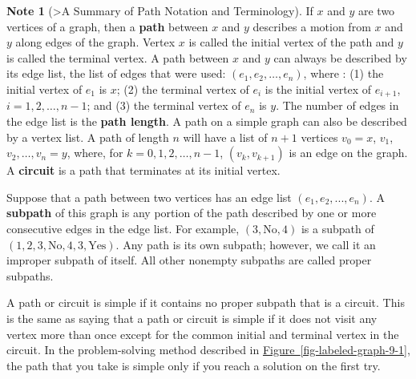 \documentclass[10pt,]{book}
\newcommand{\terminology}[1]{\textbf{#1}}
\theoremstyle{plain}
\theoremstyle{definition}
\theoremstyle{definition}
\newtheorem{note}[theorem]{Note}
\theoremstyle{definition}
\theoremstyle{definition}
\theoremstyle{definition}
\numberwithin{equation}{section}
\begin{document}
\begin{note}[>A Summary of Path Notation and Terminology]\label{note-2}
If \(x\) and \(y\) are two vertices of a graph, then a \terminology{path} between \(x\) and \(y\) describes a motion from \(x\) and
\(y\) along edges of the graph. Vertex \(x\) is called the initial vertex of the path and \(y\) is called the terminal vertex.
A path between \(x\) and \(y\) can always be described by its  edge list, the list of edges that were used: \(\left(e_1, e_2,
\ldots , e_n\right)\), where : (1) the initial vertex of \(e_1\) is \(x\); (2) the terminal vertex of \(e_i\) is the initial vertex of \(e_{i+1}\), \(i = 1, 2, \ldots , n - 1\); and (3) the terminal vertex of \(e_n\) is \(y\). The number of edges in the edge list is the \terminology{path length}. A path on a simple graph can also be described by a vertex list. A path of length \(n\) will have a list of \(n + 1\) vertices
\(v_0=x\), \(v_1\), \(v_2,\ldots ,v_n=y\), where, for \(k = 0,1,2,\ldots , n-1\), \(\left(v_k,v_{k+1}\right)\) is an edge on the graph. A \terminology{
circuit} is a path that terminates at its initial vertex.%
\par
Suppose that a path between two vertices has an edge list \((e_1, e_2 , . . . ,e_n)\). A \terminology{subpath} of this graph is any portion of the path described by one or more consecutive edges in the edge list. For example, \((3, \textrm{No}, 4)\) is a subpath of \((1,2,3, \textrm{No}, 4, 3, \text{Yes})\).  Any path is its own subpath; however, we call it an improper subpath of itself. All other nonempty subpaths are called proper subpaths.%
\par
A path or circuit is  simple if it contains no proper subpath that is a circuit. This is the same as saying that a path or circuit is simple
if it does not visit any vertex more than once except for the common initial and terminal vertex in the circuit. In the problem-solving method described in \hyperref[fig-labeled-graph-9-1]{Figure~\ref{fig-labeled-graph-9-1}}, the path that you take is simple only if you reach a solution on the first try.%
\end{note}
\end{document}
